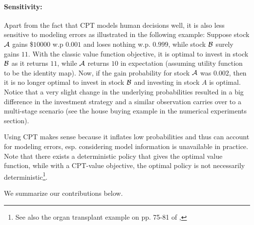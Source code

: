 \documentclass[11pt,letterpaper,english]{article}
\begin{document}
\paragraph{Sensitivity:}
Apart from the fact that CPT models human decisions well, it is also less sensitive to modeling errors as illustrated in the following example: 
Suppose stock $\cal{A}$ gains \$$10000$ w.p $0.001$ and loses nothing w.p. $0.999$, while stock $\cal B$ surely gains $11$. With the classic value function objective, it is optimal to invest in stock $\cal B$ as it returns $11$,  while $\cal A$ returns $10$ in expectation (assuming utility function to be the identity map). Now, if the gain probability for stock $\cal A$ was $0.002$, then it is no longer optimal to invest in stock $\cal B$ and investing in stock $A$ is optimal.
Notice that a very slight change in the underlying probabilities resulted in a big difference in the investment strategy and a similar observation carries over to a multi-stage scenario (see the house buying example in the numerical experiments section). 

Using CPT makes sense because it inflates low probabilities and thus can account for modeling errors, esp. considering model information is unavailable in practice.
Note that there exists a deterministic policy that gives the optimal value function, while with a CPT-value objective, the optimal policy is not necessarily deterministic\footnote{See also the organ transplant example on pp. 75-81 of \cite{lin2013stochastic},}. 


\noindent We summarize our contributions below.
\end{document}

